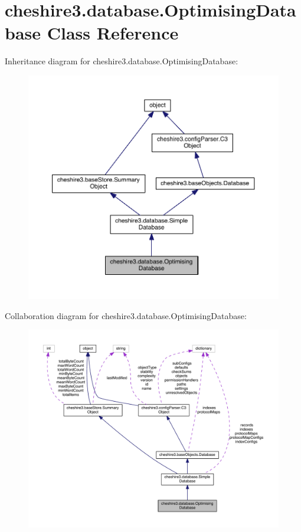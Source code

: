 \hypertarget{classcheshire3_1_1database_1_1_optimising_database}{\section{cheshire3.\-database.\-Optimising\-Database Class Reference}
\label{classcheshire3_1_1database_1_1_optimising_database}
}


Inheritance diagram for cheshire3.\-database.\-Optimising\-Database\-:
\nopagebreak
\begin{figure}[H]
\begin{center}
\leavevmode
\includegraphics[width=350pt]{classcheshire3_1_1database_1_1_optimising_database__inherit__graph}
\end{center}
\end{figure}


Collaboration diagram for cheshire3.\-database.\-Optimising\-Database\-:
\nopagebreak
\begin{figure}[H]
\begin{center}
\leavevmode
\includegraphics[width=350pt]{classcheshire3_1_1database_1_1_optimising_database__coll__graph}
\end{center}
\end{figure}
